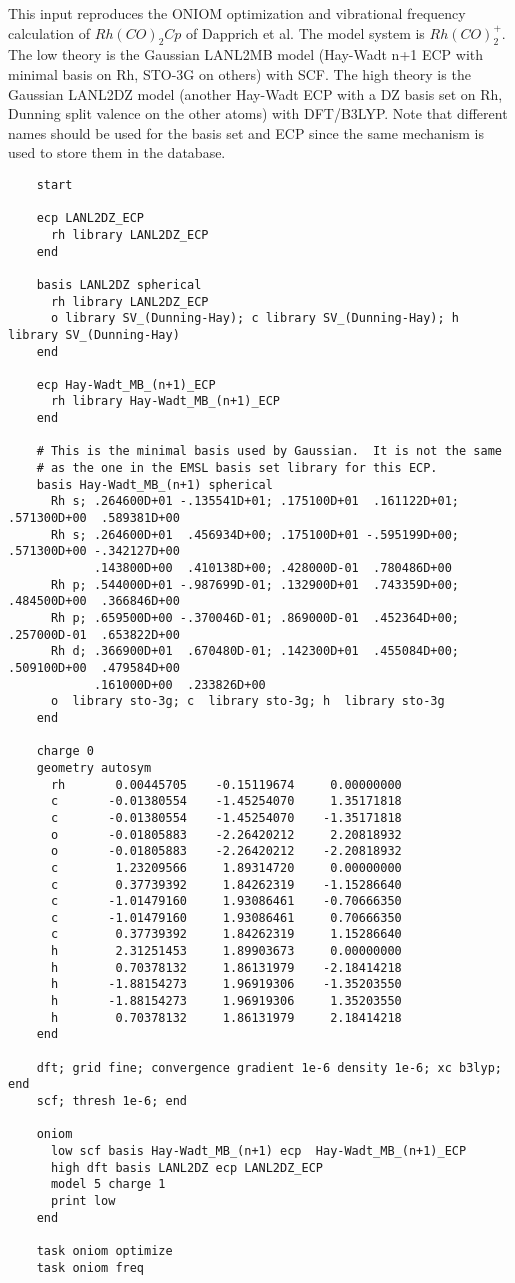 This input reproduces the ONIOM optimization and vibrational frequency
calculation of $Rh(CO)_2Cp$ of Dapprich et al.  The model system is
$Rh(CO)_2^+$.  The low theory is the Gaussian LANL2MB model (Hay-Wadt
n+1 ECP with minimal basis on Rh, STO-3G on others) with SCF.  The
high theory is the Gaussian LANL2DZ model (another Hay-Wadt ECP with a
DZ basis set on Rh, Dunning split valence on the other atoms) with
DFT/B3LYP.  Note that different names should be used for the basis set
and ECP since the same mechanism is used to store them in the
database.

\begin{verbatim}
    start

    ecp LANL2DZ_ECP
      rh library LANL2DZ_ECP
    end

    basis LANL2DZ spherical
      rh library LANL2DZ_ECP
      o library SV_(Dunning-Hay); c library SV_(Dunning-Hay); h library SV_(Dunning-Hay)
    end

    ecp Hay-Wadt_MB_(n+1)_ECP
      rh library Hay-Wadt_MB_(n+1)_ECP
    end

    # This is the minimal basis used by Gaussian.  It is not the same 
    # as the one in the EMSL basis set library for this ECP.
    basis Hay-Wadt_MB_(n+1) spherical 
      Rh s; .264600D+01 -.135541D+01; .175100D+01  .161122D+01; .571300D+00  .589381D+00
      Rh s; .264600D+01  .456934D+00; .175100D+01 -.595199D+00; .571300D+00 -.342127D+00
            .143800D+00  .410138D+00; .428000D-01  .780486D+00
      Rh p; .544000D+01 -.987699D-01; .132900D+01  .743359D+00; .484500D+00  .366846D+00
      Rh p; .659500D+00 -.370046D-01; .869000D-01  .452364D+00; .257000D-01  .653822D+00
      Rh d; .366900D+01  .670480D-01; .142300D+01  .455084D+00; .509100D+00  .479584D+00
            .161000D+00  .233826D+00
      o  library sto-3g; c  library sto-3g; h  library sto-3g
    end

    charge 0
    geometry autosym
      rh       0.00445705    -0.15119674     0.00000000
      c       -0.01380554    -1.45254070     1.35171818
      c       -0.01380554    -1.45254070    -1.35171818
      o       -0.01805883    -2.26420212     2.20818932
      o       -0.01805883    -2.26420212    -2.20818932
      c        1.23209566     1.89314720     0.00000000
      c        0.37739392     1.84262319    -1.15286640
      c       -1.01479160     1.93086461    -0.70666350
      c       -1.01479160     1.93086461     0.70666350
      c        0.37739392     1.84262319     1.15286640
      h        2.31251453     1.89903673     0.00000000
      h        0.70378132     1.86131979    -2.18414218
      h       -1.88154273     1.96919306    -1.35203550
      h       -1.88154273     1.96919306     1.35203550
      h        0.70378132     1.86131979     2.18414218
    end

    dft; grid fine; convergence gradient 1e-6 density 1e-6; xc b3lyp; end
    scf; thresh 1e-6; end

    oniom
      low scf basis Hay-Wadt_MB_(n+1) ecp  Hay-Wadt_MB_(n+1)_ECP
      high dft basis LANL2DZ ecp LANL2DZ_ECP
      model 5 charge 1
      print low
    end

    task oniom optimize
    task oniom freq
\end{verbatim}

